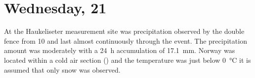 \section{Wednesday, \SI{21}{\dec}}\label{sec:2112}

At the Haukeliseter measurement site was precipitation observed by the double fence from \SI{10}{\UTC} and last almost continuously through the event. The precipitation amount was moderately with a \SI{24}{\hour} accumulation of \SI{17.1}{\mm}. Norway was located within a cold air section () and the temperature was just below \SI{0}{\celsius} it is assumed that only snow was observed. 

